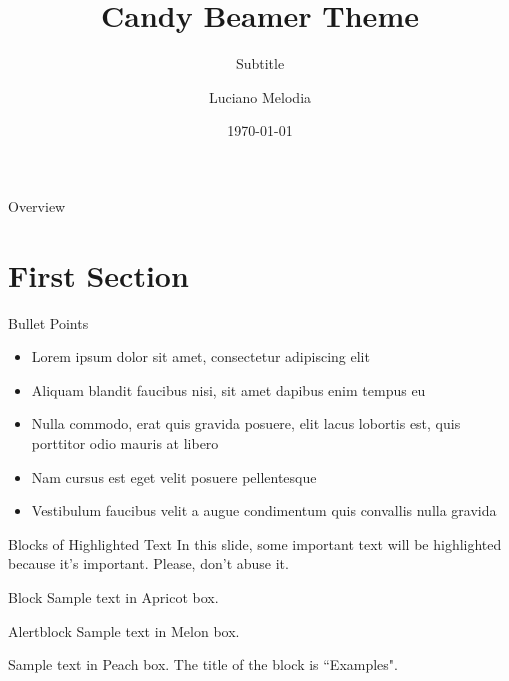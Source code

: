 \documentclass[aspectratio=169,xcolor=dvipsnames,12pt]{beamer}
\title[short title]{Candy Beamer Theme}
\subtitle{Subtitle}
\author[LuMe]{Luciano Melodia}
\institute[FAU]
{
    Department of Mathematics \\
    Friedrich-Alexander Universität Erlangen-Nürnberg
}
\date{\today}
\begin{document}
\begin{frame}
    \titlepage
\end{frame}

\begin{frame}{Overview}
    \tableofcontents
\end{frame}

\section{First Section}

\begin{frame}{Bullet Points}
    \begin{itemize}
        \item Lorem ipsum dolor sit amet, consectetur adipiscing elit
        \item Aliquam blandit faucibus nisi, sit amet dapibus enim tempus eu
        \item Nulla commodo, erat quis gravida posuere, elit lacus lobortis est, quis porttitor odio mauris at libero
        \item Nam cursus est eget velit posuere pellentesque
        \item Vestibulum faucibus velit a augue condimentum quis convallis nulla gravida
    \end{itemize}
\end{frame}


\begin{frame}{Blocks of Highlighted Text}
    In this slide, some important text will be \alert{highlighted} because it's important. Please, don't abuse it.

    \begin{block}{Block}
        Sample text in Apricot box.
    \end{block}

    \begin{alertblock}{Alertblock}
        Sample text in Melon box.
    \end{alertblock}

    \begin{examples}
        Sample text in Peach box. The title of the block is ``Examples".
    \end{examples}
\end{frame}

\end{document}
